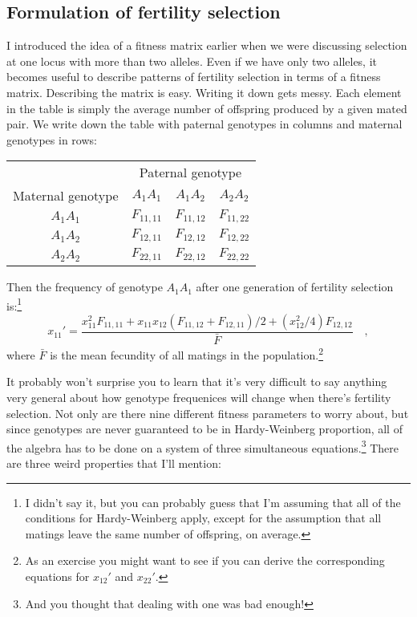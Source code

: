 \documentclass[12pt]{article}
\begin{document}
\subsection*{Formulation of fertility selection}

I introduced the idea of a fitness matrix earlier when we were
discussing selection at one locus with more than two alleles. Even if
we have only two alleles, it becomes useful to describe patterns of
fertility selection in terms of a fitness matrix. Describing the
matrix is easy. Writing it down gets messy. Each element in the table
is simply the average number of offspring produced by a given mated
pair. We write down the table with paternal genotypes in columns and
maternal genotypes in rows:
\begin{center}
\begin{tabular}{c|ccc}
\hline\hline
                  & \multicolumn{3}{c}{Paternal genotype} \\
Maternal genotype & $A_1A_1$ & $A_1A_2$ & $A_2A_2$ \\
\hline
$A_1A_1$ & $F_{11,11}$ & $F_{11,12}$ & $F_{11,22}$ \\
$A_1A_2$ & $F_{12,11}$ & $F_{12,12}$ & $F_{12,22}$ \\
$A_2A_2$ & $F_{22,11}$ & $F_{22,12}$ & $F_{22,22}$ \\
\hline
\end{tabular}
\end{center}
Then the frequency of genotype $A_1A_1$ after one generation of
fertility selection is:\footnote{I didn't say it, but you can probably
  guess that I'm assuming that all of the conditions for
  Hardy-Weinberg apply, except for the assumption that all matings
  leave the same number of offspring, on average.}
\begin{equation}
x_{11}' = \frac{x_{11}^2F_{11,11} + x_{11}x_{12}(F_{11,12} +
                F_{12,11})/2 + (x_{12}^2/4)F_{12,12}}{\bar F} \quad ,
\label{eq:fertility}
\end{equation}
where $\bar F$ is the mean fecundity of all matings in the
population.\footnote{As an exercise you might want to see if you can
derive the corresponding equations for $x_{12}'$ and $x_{22}'$.}

It probably won't surprise you to learn that it's very difficult to
say anything very general about how genotype frequenices will change
when there's fertility selection. Not only are there nine different
fitness parameters to worry about, but since genotypes are never
guaranteed to be in Hardy-Weinberg proportion, all of the algebra has
to be done on a system of three simultaneous equations.\footnote{And
you thought that dealing with one was bad enough!} There are three
weird properties that I'll mention:
\end{document}
